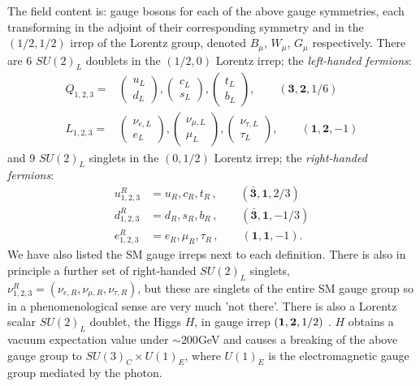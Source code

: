 The field content is: gauge bosons for each of the above gauge symmetries, each transforming in the adjoint of their corresponding symmetry and in the $(1/2,1/2)$ irrep of the Lorentz group, denoted $B_{\mu}$, $W_{\mu}$, $G_{\mu}$ respectively. There are 6 $SU(2)_L$ doublets in the $(1/2,0)$ Lorentz irrep; the {\it{left-handed fermions}}:
\begin{align}
  Q_{1,2,3} =&
  \begin{pmatrix} u_L \\ d_L \end{pmatrix},
  \begin{pmatrix} c_L \\ s_L \end{pmatrix},
  \begin{pmatrix} t_L \\ b_L \end{pmatrix}
  ,\quad\quad
  (\mathbf{3},\mathbf{2},1/6) \\
  L_{1,2,3} =&
  \begin{pmatrix} \nu_{e,L} \\ e_L \end{pmatrix},
  \begin{pmatrix} \nu_{\mu,L} \\ \mu_L \end{pmatrix},
  \begin{pmatrix} \nu_{\tau,L} \\ \tau_L \end{pmatrix}
  ,\quad\quad
  (\mathbf{1},\mathbf{2},-1)
\end{align}
and 9 $SU(2)_L$ singlets in the $(0,1/2)$ Lorentz irrep; the {\it{right-handed fermions}}:
\begin{align}
  u^R_{1,2,3} &= u_R, c_R, t_R\,,\quad\quad (\bar{\mathbf{3}},\mathbf{1},2/3) \\
  d^R_{1,2,3} &= d_R, s_R, b_R\,,\quad\quad (\bar{\mathbf{3}},\mathbf{1},-1/3) \\
  e^R_{1,2,3} &= e_R, \mu_R, \tau_R\,,\quad\quad (\mathbf{1},\mathbf{1},-1).
\end{align}
We have also listed the SM gauge irreps next to each definition. There is also in principle a further set of right-handed $SU(2)_L$ singlets, $\nu^R_{1,2,3} = (\nu_{e,R}, \nu_{\mu,R}, \nu_{\tau,R})$, but these are singlets of the entire SM gauge group so in a phenomenological sense are very much 'not there'. There is also a Lorentz scalar $SU(2)_L$ doublet, the Higgs $H$, in gauge irrep $({\bf{1}},{\bf{2}},1/2)$ \cite{PhysRevLett.13.321,PhysRevLett.13.508,PhysRevLett.13.585}. $H$ obtains a vacuum expectation value under $\sim 200$GeV and causes a breaking of the above gauge group to $SU(3)_C\times U(1)_E$, where $U(1)_E$ is the electromagnetic gauge group mediated by the photon.
